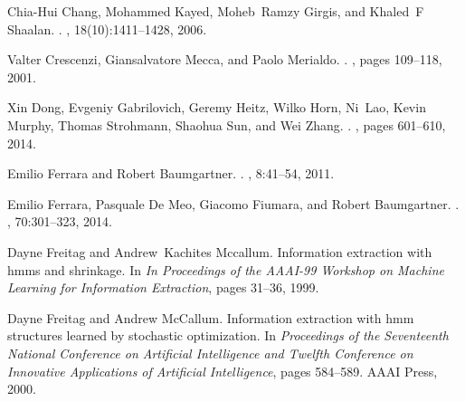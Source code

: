 \documentclass{nle}
\begin{document}
\begin{thebibliography}{}
Chia-Hui Chang, Mohammed Kayed, Moheb~Ramzy Girgis, and Khaled~F Shaalan.
.
,
  18(10):1411--1428, 2006.

Valter Crescenzi, Giansalvatore Mecca, and Paolo Merialdo.
.
, pages 109--118, 2001.

Xin Dong, Evgeniy Gabrilovich, Geremy Heitz, Wilko Horn, Ni~Lao, Kevin Murphy,
  Thomas Strohmann, Shaohua Sun, and Wei Zhang.
.
, pages 601--610, 2014.

Emilio Ferrara and Robert Baumgartner.
.
, 8:41--54, 2011.

Emilio Ferrara, Pasquale {De Meo}, Giacomo Fiumara, and Robert Baumgartner.
.
, 70:301--323, 2014.

Dayne Freitag and Andrew~Kachites Mccallum.
\newblock Information extraction with hmms and shrinkage.
\newblock In {\em In Proceedings of the AAAI-99 Workshop on Machine Learning
  for Information Extraction}, pages 31--36, 1999.

Dayne Freitag and Andrew McCallum.
\newblock Information extraction with hmm structures learned by stochastic
  optimization.
\newblock In {\em Proceedings of the Seventeenth National Conference on
  Artificial Intelligence and Twelfth Conference on Innovative Applications of
  Artificial Intelligence}, pages 584--589. AAAI Press, 2000.


\end{thebibliography}
\end{document}
